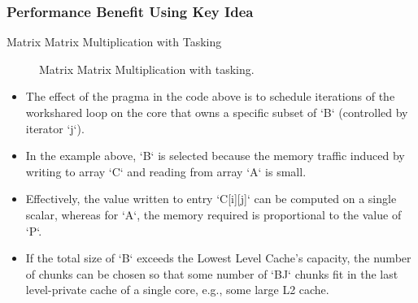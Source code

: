 \begin{frame}
\frametitle{Performance Benefit Using Key Idea} {Matrix Matrix Multiplication with Tasking}
\begin{figure}

\caption{Matrix Matrix Multiplication with tasking.}
\end{figure}

\begin{itemize} 
\tiny \item \tiny  The effect of the pragma in the code above is to schedule iterations of the workshared loop on the core that owns a specific subset of `B` (controlled by iterator `j`). 

\item \tiny In the example above, `B` is selected because the memory traffic induced by writing to array `C` and reading from array `A` is small. 

\item \tiny Effectively, the value written to entry `C[i][j]` can be computed on a single scalar, whereas for `A`, the memory required is proportional to the value of `P`. 

\item \tiny  If the total size of `B` exceeds the Lowest Level Cache’s capacity, the number of chunks can be chosen so that some number of `BJ` chunks fit in the last level-private cache of a single core, e.g., some large L2 cache. 
\end{itemize} 
\end{frame} 


